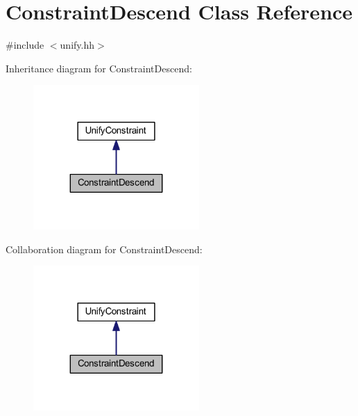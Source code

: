 \hypertarget{class_constraint_descend}{}\section{Constraint\+Descend Class Reference}
\label{class_constraint_descend}


{\ttfamily \#include $<$unify.\+hh$>$}



Inheritance diagram for Constraint\+Descend\+:
\nopagebreak
\begin{figure}[H]
\begin{center}
\leavevmode
\includegraphics[width=179pt]{class_constraint_descend__inherit__graph}
\end{center}
\end{figure}


Collaboration diagram for Constraint\+Descend\+:
\nopagebreak
\begin{figure}[H]
\begin{center}
\leavevmode
\includegraphics[width=179pt]{class_constraint_descend__coll__graph}
\end{center}
\end{figure}

